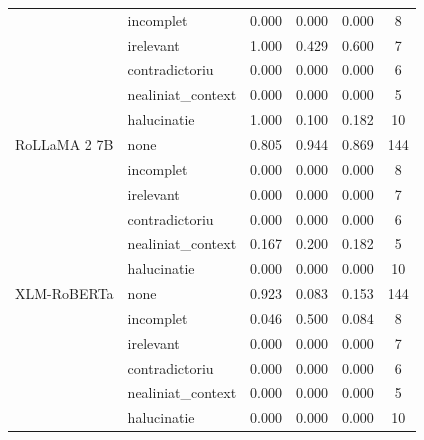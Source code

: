 \begin{table}[H]
\begin{tabular}{llcccc}
 & incomplet & 0.000 & 0.000 & 0.000 & 8 \\
 & irelevant & 1.000 & 0.429 & 0.600 & 7 \\
 & contradictoriu & 0.000 & 0.000 & 0.000 & 6 \\
 & nealiniat\_context & 0.000 & 0.000 & 0.000 & 5 \\
 & halucinatie & 1.000 & 0.100 & 0.182 & 10 \\
\midrule
RoLLaMA 2 7B & none & 0.805 & 0.944 & 0.869 & 144 \\
 & incomplet & 0.000 & 0.000 & 0.000 & 8 \\
 & irelevant & 0.000 & 0.000 & 0.000 & 7 \\
 & contradictoriu & 0.000 & 0.000 & 0.000 & 6 \\
 & nealiniat\_context & 0.167 & 0.200 & 0.182 & 5 \\
 & halucinatie & 0.000 & 0.000 & 0.000 & 10 \\
\midrule
XLM-RoBERTa & none & 0.923 & 0.083 & 0.153 & 144 \\
 & incomplet & 0.046 & 0.500 & 0.084 & 8 \\
 & irelevant & 0.000 & 0.000 & 0.000 & 7 \\
 & contradictoriu & 0.000 & 0.000 & 0.000 & 6 \\
 & nealiniat\_context & 0.000 & 0.000 & 0.000 & 5 \\
 & halucinatie & 0.000 & 0.000 & 0.000 & 10 \\
\bottomrule
\end{tabular}
\end{table}
